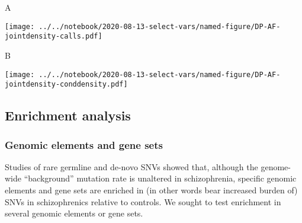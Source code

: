 \documentclass[letterpaper]{article}
\begin{document}
A

\texttt{[image: ../../notebook/2020-08-13-select-vars/named-figure/DP-AF-jointdensity-calls.pdf]}

B

\texttt{[image: ../../notebook/2020-08-13-select-vars/named-figure/DP-AF-jointdensity-conddensity.pdf]}

\subsection*{Enrichment analysis}

\subsubsection*{Genomic elements and gene sets}

Studies of rare germline and de-novo SNVs showed that,
although the genome-wide ``background'' mutation rate is unaltered in
schizophrenia, specific genomic elements and gene sets are enriched in (in
other words bear increased burden of) SNVs in schizophrenics relative to
controls.  We sought to test enrichment in several genomic elements or gene
sets.
\end{document}
